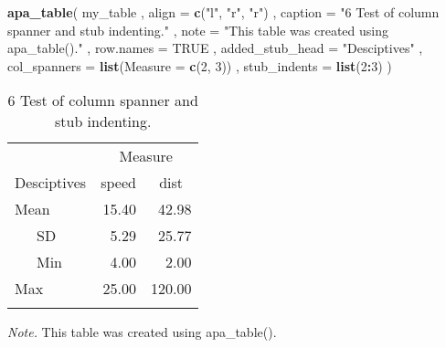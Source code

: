 \documentclass[man]{apa6}
\newenvironment{Shaded}{\begin{snugshade}}{\end{snugshade}}
\newcommand{\KeywordTok}[1]{\textcolor[rgb]{0.13,0.29,0.53}{\textbf{#1}}}
\newcommand{\DataTypeTok}[1]{\textcolor[rgb]{0.13,0.29,0.53}{#1}}
\newcommand{\DecValTok}[1]{\textcolor[rgb]{0.00,0.00,0.81}{#1}}
\newcommand{\StringTok}[1]{\textcolor[rgb]{0.31,0.60,0.02}{#1}}
\newcommand{\OtherTok}[1]{\textcolor[rgb]{0.56,0.35,0.01}{#1}}
\newcommand{\OperatorTok}[1]{\textcolor[rgb]{0.81,0.36,0.00}{\textbf{#1}}}
\newcommand{\NormalTok}[1]{#1}
\begin{document}
\begin{Shaded}
\begin{Highlighting}[]
\KeywordTok{apa_table}\NormalTok{(}
\NormalTok{  my_table}
\NormalTok{  , }\DataTypeTok{align =} \KeywordTok{c}\NormalTok{(}\StringTok{"l"}\NormalTok{, }\StringTok{"r"}\NormalTok{, }\StringTok{"r"}\NormalTok{)}
\NormalTok{  , }\DataTypeTok{caption =} \StringTok{"6 Test of column spanner and stub indenting."}
\NormalTok{  , }\DataTypeTok{note =} \StringTok{"This table was created using apa_table()."}
\NormalTok{  , }\DataTypeTok{row.names =} \OtherTok{TRUE}
\NormalTok{  , }\DataTypeTok{added_stub_head =} \StringTok{"Desciptives"}
\NormalTok{  , }\DataTypeTok{col_spanners =} \KeywordTok{list}\NormalTok{(}\DataTypeTok{Measure =} \KeywordTok{c}\NormalTok{(}\DecValTok{2}\NormalTok{, }\DecValTok{3}\NormalTok{))}
\NormalTok{  , }\DataTypeTok{stub_indents =} \KeywordTok{list}\NormalTok{(}\DecValTok{2}\OperatorTok{:}\DecValTok{3}\NormalTok{)}
\NormalTok{)}
\end{Highlighting}
\end{Shaded}

\begin{table}[tbp]
\begin{center}
\begin{threeparttable}
\caption{\label{tab:unnamed-chunk-6}6 Test of column spanner and stub indenting.}
\begin{tabular}{lrr}
\toprule
 & \multicolumn{2}{c}{Measure} \\
\cmidrule(r){2-3}
Desciptives & \multicolumn{1}{c}{speed} & \multicolumn{1}{c}{dist}\\
\midrule
Mean & 15.40 & 42.98\\
\ \ \ SD & 5.29 & 25.77\\
\ \ \ Min & 4.00 & 2.00\\
Max & 25.00 & 120.00\\
\bottomrule
\addlinespace
\end{tabular}
\begin{tablenotes}[para]
\textit{Note.} This table was created using apa\_table().
\end{tablenotes}
\end{threeparttable}
\end{center}
\end{table}
\end{document}
